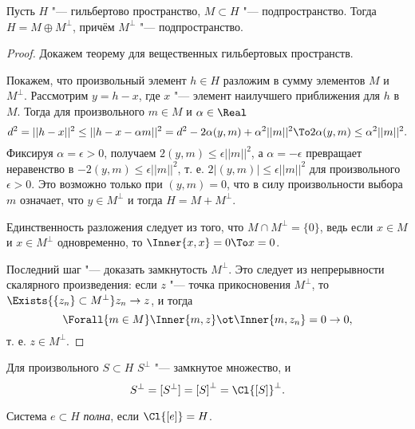 \documentclass[main]{subfiles}
\begin{document}
\begin{theorem}[о проекции]%
  Пусть \( H \) "--- гильбертово пространство, \( M \subset H \) "---
  подпространство. Тогда \( H = M \oplus M^\perp \),
  причём \( M^\perp \) "--- подпространство.
\end{theorem}
\begin{proof}
  Докажем теорему для вещественных гильбертовых пространств. 

  Покажем, что произвольный элемент \( h \in H \) разложим
  в сумму элементов \( M \) и \( M^\perp \).
  Рассмотрим \( y = h - x \), где \( x \) "---
  элемент наилучшего приближения для \( h \) в \( M \).
  Тогда для произвольного \( m \in M \) и \( \alpha \in \Real \)
  \[ d^2 = ||h - x||^2 \le ||h - x - \alpha m||^2 =
  d^2 - 2 \alpha (y, m) + \alpha^2 ||m||^2 \To
  2 \alpha (y, m) \le \alpha^2 ||m||^2. \]
  Фиксируя \( \alpha = \epsilon > 0 \),
  получаем \( 2 (y, m) \le \epsilon ||m||^2 \),
  а \( \alpha = -\epsilon \)
  превращает неравенство в \( - 2 (y, m) \le \epsilon ||m||^2 \),
  т. е. \( 2 |(y, m)| \le \epsilon ||m||^2 \) для произвольного \( \epsilon > 0 \).
  Это возможно только при \( (y, m) = 0 \),
  что в силу произвольности выбора \( m \)
  означает, что \( y \in M^\perp \)
  и тогда \( H = M + M^\perp \).

  Единственность разложения следует из того,
  что \( M \cap M^\perp = \{ 0 \} \),
  ведь если \( x \in M \) и \( x \in M^\perp \)
  одновременно, то \( \Inner{x, x} = 0 \To x = 0 \).

  Последний шаг "--- доказать замкнутость \( M^\perp \).
  Это следует из непрерывности скалярного произведения:
  если \( z \) "--- точка прикосновения \( M^\perp \), то
  \( \Exists{ \{ z_n \} \subset M^\perp } z_n \to z \),
  и тогда
  \[ \Forall{m \in M} \Inner{m, z} \ot \Inner{m, z_n} = 0 \to 0, \]
  т. е. \( z \in M^\perp \).
\end{proof}

\begin{exercise}
  Для произвольного \( S \subset H \) \( S^\perp \) "--- замкнутое множество,
  и
  \[ S^\perp = [S^\perp] = {[S]}^\perp = \Cl{[S]}^\perp. \]
\end{exercise}

\begin{definition}
  Система \( e \subset H \) \emph{полна}, если \( \Cl{[e]} = H \).
\end{definition}
\end{document}
